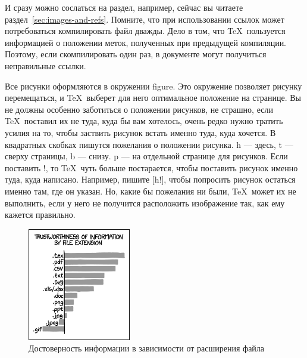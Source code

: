 \documentclass[russian]{lecture-notes}
\begin{document}
И сразу можно сослаться на раздел, например, сейчас вы читаете раздел~\ref{sec:images-and-refs}.
Помните, что при использовании ссылок может потребоваться компилировать файл дважды.
Дело в том, что \TeX\ пользуется информацией о положении меток, полученных при предыдущей компиляции.
Поэтому, если скомпилировать один раз, в документе могут получиться неправильные ссылки.

Все рисунки оформляются в окружении figure. Это окружение позволяет рисунку перемещаться,
и \TeX\ выберет для него оптимальное положение на странице. Вы не должны особенно заботиться о положении
рисунков, не страшно, если \TeX\ поставил их не туда, куда бы вам хотелось, очень редко нужно тратить
усилия на то, чтобы заствить рисунок встать именно туда, куда хочется.
В квадратных скобках пишутся пожелания о положении рисунка. h — здесь, t — сверху страницы, b — снизу. p — на
отдельной странице для рисунков. Если поставить !, то \TeX\ чуть больше постарается, чтобы поставить рисунок
именно туда, куда написано. Например, пишите [h!], чтобы попросить рисунок остаться именно там, где
он указан.
Но, какие бы пожелания ни были, \TeX\ может их не выполнить, если у него не получится расположить
изображение так, как ему кажется правильно.

\begin{figure}[htb]
    \centering %
    \includegraphics[width=0.4\textwidth]{xkcd1301.png}
    \caption{Достоверность информации в зависимости от расширения файла}
    \label{fig:example1}
\end{figure}
\end{document}
